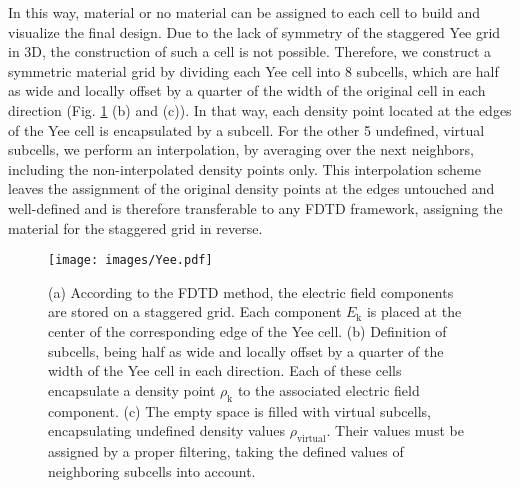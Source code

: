 \documentclass[aps,prl,twocolumn,superscriptaddress,longbibliography]{revtex4-1}
\begin{document}
In this way, material or no material can be assigned to each cell to build and visualize the final design. Due to the lack of symmetry of the staggered Yee grid in 3D, the construction of such a cell is not possible. Therefore, we construct a symmetric material grid by dividing each Yee cell into 8 subcells, which are half as wide and locally offset by a quarter of the width of the original cell in each direction (Fig. \ref{Interpolation} (b) and (c)). 
In that way, each density point located at the edges of the Yee cell is encapsulated by a subcell. For the other 5 undefined, virtual subcells, we perform an interpolation, by averaging over the next neighbors, including the non-interpolated density points only. This interpolation scheme leaves the assignment of the original density points at the edges untouched and well-defined and is therefore transferable to any FDTD framework, assigning the material for the staggered grid in reverse. 

\begin{figure}[t!]
\texttt{[image: images/Yee.pdf]}
\caption{\label{Interpolation} (a) According to the FDTD method, the electric field components are stored on a staggered grid. Each component $E_{\mathrm{k}}$ is placed at the center of the corresponding edge of the Yee cell. (b) Definition of subcells, being half as wide and locally offset by a quarter of the width of the Yee cell in each direction. Each of these cells encapsulate a density point $\rho_{\mathrm{k}}$ to the associated electric field component. (c) The empty space is filled with virtual subcells, encapsulating undefined density values $\rho_{\mathrm{virtual}}$. Their values must be assigned by a proper filtering, taking the defined values of neighboring subcells into account.}
\end{figure}
\end{document}
